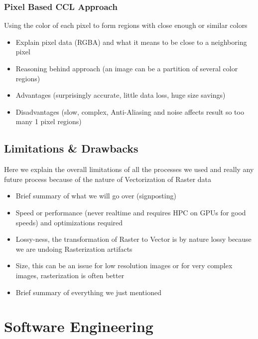 \documentclass[12pt]{article}
\begin{document}
    \subsubsection{Pixel Based CCL Approach}

    Using the color of each pixel to form regions with close enough or similar colors

    \begin{itemize}
        \item Explain pixel data (RGBA) and what it means to be close to a neighboring pixel
        \item Reasoning behind approach (an image can be a partition of several color regions)
        \item Advantages (surprisingly accurate, little data loss, huge size savings)
        \item Disadvantages (slow, complex, Anti-Aliasing and noise affects result so too many 1 pixel regions)
    \end{itemize}

    \subsection{Limitations \& Drawbacks}

    Here we explain the overall limitations of all the processes we used and really any future process because
    of the nature of Vectorization of Raster data

    \begin{itemize}
        \item Brief summary of what we will go over (signposting)
        \item Speed or performance (never realtime and requires HPC on GPUs for good speeds) and optimizations required
        \item Lossy-ness, the transformation of Raster to Vector is by nature lossy because we are undoing Rasterization
        artifacts
        \item Size, this can be an issue for low resolution images or for very complex images, rasterization is often better
        \item Brief summary of everything we just mentioned
    \end{itemize}

    \pagebreak


    \section{Software Engineering}
\end{document}
